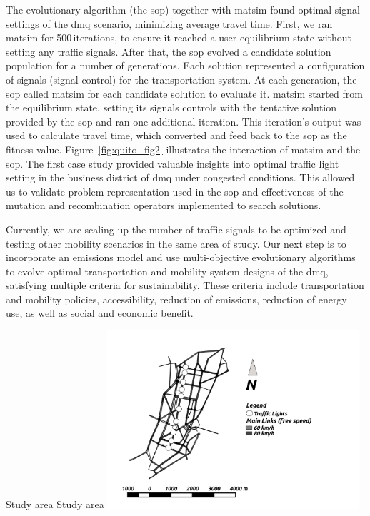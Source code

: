The evolutionary algorithm (the \gls{sop}) together with \gls{matsim} found optimal signal settings of the \gls{dmq} scenario, minimizing average travel time. First, we ran \gls{matsim} for 500\,iterations, to ensure it reached a user equilibrium state without setting any traffic signals. After that, the \gls{sop} evolved a candidate solution population for a number of generations. Each solution represented a configuration of signals (signal control) for the transportation system. At each generation, the \gls{sop} called \gls{matsim} for each candidate solution to evaluate it. \gls{matsim} started from the equilibrium state, setting its signals controls with the tentative solution provided by the \gls{sop} and ran one additional iteration. This iteration's output was used to calculate travel time, which converted and feed back to the \gls{sop} as the fitness value.
Figure~\ref{fig:quito_fig2} illustrates the interaction of \gls{matsim} and the \gls{sop}. The first case study \citep[][]{ArmasEtAl_SEAL_2014} provided valuable insights into optimal traffic light setting in the business district of \gls{dmq} under congested conditions. This allowed us to validate problem representation used in the \gls{sop} and effectiveness of the mutation and recombination operators implemented to search solutions. 

Currently, we are scaling up the number of traffic signals to be optimized and testing other mobility scenarios in the same area of study. Our next step is to incorporate an emissions model and use multi-objective evolutionary algorithms \citep[][]{AguireEtAl_EMO_2013} to evolve optimal transportation and mobility system designs of the \gls{dmq}, satisfying multiple criteria for sustainability. These criteria include transportation and mobility policies, accessibility, reduction of emissions, reduction of energy use, as well as social and economic benefit.

\createfigure%
{Study area}%
{Study area}%
{\label{fig:quito_fig1}}%
{\includegraphics[width=0.7\textwidth, angle=0]{./scenarios/figures/qfig1.png}}%
{}

